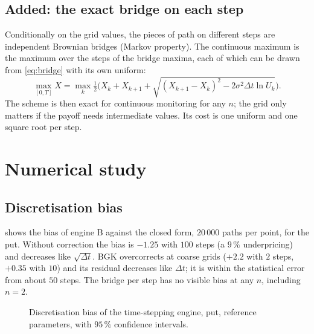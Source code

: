 \documentclass[11pt,a4paper]{article}
\theoremstyle{remark}
\begin{document}
\subsection{Added: the exact bridge on each step}
Conditionally on the grid values, the pieces of path on different steps are independent Brownian bridges (Markov property).
The continuous maximum is the maximum over the steps of the bridge maxima, each of which can be drawn from \eqref{eq:bridge}
with its own uniform:
\begin{equation}
  \max_{[0,T]}X=\max_{k}\tfrac12\Big(X_k+X_{k+1}+\sqrt{(X_{k+1}-X_k)^2-2\sigma^2\Delta t\ln U_k}\Big).
\end{equation}
The scheme is then exact for continuous monitoring for any $n$; the grid only matters if the payoff needs intermediate values.
Its cost is one uniform and one square root per step.

\section{Numerical study}\label{sec:num}
\subsection{Discretisation bias}
 shows the bias of engine B against the closed form, $20\,000$ paths per point, for the put. Without correction
the bias is $-1.25$ with $100$ steps (a $9\,\%$ underpricing) and decreases like $\sqrt{\Delta t}$. BGK overcorrects at coarse
grids ($+2.2$ with $2$ steps, $+0.35$ with $10$) and its residual decreases like $\Delta t$; it is within the statistical error from
about $50$ steps. The bridge per step has no visible bias at any $n$, including $n=2$.

\begin{figure}[ht]\centering
{}
\caption{Discretisation bias of the time-stepping engine, put, reference parameters, with $95\,\%$ confidence intervals.}\label{fig:bias}
\end{figure}
\end{document}
